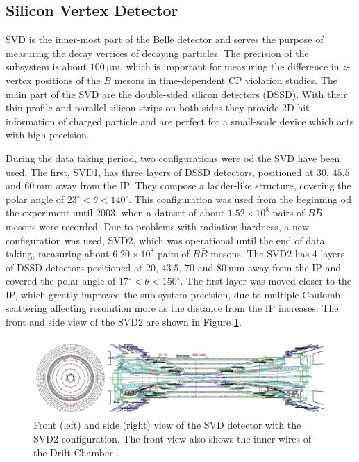 \documentclass[headings=standardclasses,headings=big,oneside,a4paper,openany,12pt]{scrbook}
\newcommand {\e}[1]{\mathrm{~#1}}
\newcommand {\E}[1]{\times 10^{#1}}
\begin{document}

\subsection{Silicon Vertex Detector}
SVD is the inner-most part of the Belle detector and serves the purpose of measuring the decay vertices of decaying particles. The precision of the subsystem is about $100\e{\mu m}$, which is important for measuring the difference in $z$-vertex positions of the $B$ mesons in time-dependent CP violation studies. The main part of the SVD are the double-sided silicon detectors (DSSD). With their thin profile and parallel silicon strips on both sides they provide 2D hit information of charged particle and are perfect for a small-scale device which acts with high precision.

During the data taking period, two configurations were od the SVD have been used. The first, SVD1, has three layers of DSSD detectors, positioned at $30$, $45.5$ and $60\e{mm}$ away from the IP. They compose a ladder-like structure, covering the polar angle of $23^\circ < \theta < 140^\circ$. This configuration was used from the beginning od the experiment until 2003, when a dataset of about $1.52\E{8}$ pairs of $B \bar B$ mesons were recorded. Due to problems with radiation hardness, a new configuration was used, SVD2, which was operational until the end of data taking, measuring about $6.20\E{8}$ pairs of $B \bar B$ mesons. The SVD2 has 4 layers of DSSD detectors positioned at $20$, $43.5$, $70$ and $80\e{mm}$ away from the IP and covered the polar angle of $17^\circ < \theta < 150^\circ$. The first layer was moved closer to the IP, which greatly improved the sub-system precision, due to multiple-Coulomb scattering affecting resolution more as the distance from the IP increases. The front and side view of the SVD2 are shown in Figure \ref{fig:SVD_layout}.

\begin{figure}[H]
	\centering
	\captionsetup{width=0.8\linewidth}
	\includegraphics[width=\linewidth]{fig/setup/SVD_layout}
	\caption{Front (left) and side (right) view of the SVD detector with the SVD2 configuration. The front view also shows the inner wires of the
	Drift Chamber \cite{haba2004letter}.}
	\label{fig:SVD_layout}
\end{figure}
\end{document}
